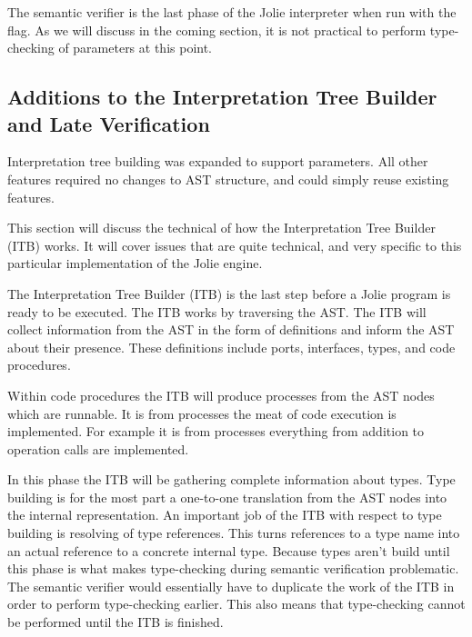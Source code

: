 The semantic verifier is the last phase of the Jolie interpreter when run with
the  flag. As we will discuss in the coming section, it is not
practical to perform type-checking of parameters at this point.

\subsection{Additions to the Interpretation Tree Builder and Late Verification}


Interpretation tree building was expanded to support parameters. All other
features required no changes to AST structure, and could simply reuse existing
features.

This section will discuss the technical of how the Interpretation Tree Builder
(ITB) works. It will cover issues that are quite technical, and very specific
to this particular implementation of the Jolie engine.


The Interpretation Tree Builder (ITB) is the last step before a Jolie program
is ready to be executed. The ITB works by traversing the AST. The ITB will
collect information from the AST in the form of definitions and inform the AST
about their presence. These definitions include ports, interfaces, types, and
code procedures.


Within code procedures the ITB will produce processes from the AST nodes which
are runnable. It is from processes the meat of code execution is implemented.
For example it is from processes everything from addition to operation calls
are implemented.


In this phase the ITB will be gathering complete information about types. Type
building is for the most part a one-to-one translation from the
AST nodes into the internal representation. An important job of the
ITB with respect to type building is resolving of type references. This turns
references to a type name into an actual reference to a concrete internal type.
Because types aren't build until this phase is what makes type-checking during
semantic verification problematic. The semantic verifier would essentially have
to duplicate the work of the ITB in order to perform type-checking earlier.
This also means that type-checking cannot be performed until the ITB is
finished.

